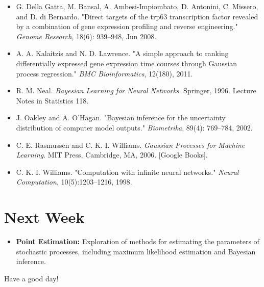 \documentclass[12pt]{article}
\begin{document}
\begin{itemize}
    \item G. Della Gatta, M. Bansal, A. Ambesi-Impiombato, D. Antonini, C. Missero, and D. di Bernardo. "Direct targets of the trp63 transcription factor revealed by a combination of gene expression profiling and reverse engineering." \textit{Genome Research}, 18(6): 939–948, Jun 2008.
    \item A. A. Kalaitzis and N. D. Lawrence. "A simple approach to ranking differentially expressed gene expression time courses through Gaussian process regression." \textit{BMC Bioinformatics}, 12(180), 2011.
    \item R. M. Neal. \textit{Bayesian Learning for Neural Networks}. Springer, 1996. Lecture Notes in Statistics 118.
    \item J. Oakley and A. O’Hagan. "Bayesian inference for the uncertainty distribution of computer model outputs." \textit{Biometrika}, 89(4): 769–784, 2002.
    \item C. E. Rasmussen and C. K. I. Williams. \textit{Gaussian Processes for Machine Learning}. MIT Press, Cambridge, MA, 2006. [Google Books].
    \item C. K. I. Williams. "Computation with infinite neural networks." \textit{Neural Computation}, 10(5):1203–1216, 1998.
\end{itemize}

\section{Next Week}

\begin{itemize}
    \item \textbf{Point Estimation:} Exploration of methods for estimating the parameters of stochastic processes, including maximum likelihood estimation and Bayesian inference.
\end{itemize}

Have a good day!
\end{document}
